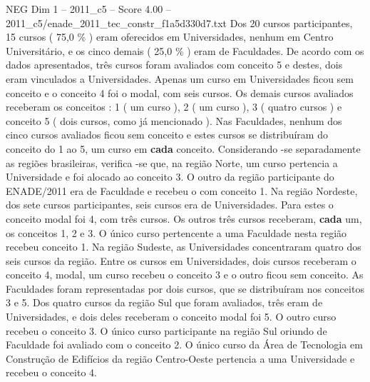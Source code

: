 \begin{textsample}{NEG Dim 1 – 2011\_c5 – Score 4.00 – 2011\_c5/enade\_2011\_tec\_constr\_f1a5d330d7.txt}
Dos 20 cursos participantes, 15 cursos ( 75,0 \% ) eram oferecidos em Universidades, nenhum em Centro Universitário, e os cinco demais ( 25,0 \% ) eram de Faculdades.
De acordo com os dados apresentados, três cursos foram avaliados com conceito 5 e destes, dois eram vinculados a Universidades.
Apenas um curso em Universidades ficou sem conceito e o conceito 4 foi o modal, com seis cursos.
Os demais cursos avaliados receberam os conceitos : 1 ( um curso ), 2 ( um curso ), 3 ( quatro cursos ) e conceito 5 ( dois cursos, como já mencionado ).
Nas Faculdades, nenhum dos cinco cursos avaliados ficou sem conceito e estes cursos se distribuíram do conceito do 1 ao 5, um curso em \textbf{cada} conceito.
Considerando -se separadamente as regiões brasileiras, verifica -se que, na região Norte, um curso pertencia a Universidade e foi alocado ao conceito 3.
O outro da região participante do ENADE/2011 era de Faculdade e recebeu o com conceito 1.
Na região Nordeste, dos sete cursos participantes, seis cursos era de Universidades.
Para estes o conceito modal foi 4, com três cursos.
Os outros três cursos receberam, \textbf{cada} um, os conceitos 1, 2 e 3.
O único curso pertencente a uma Faculdade nesta região recebeu conceito 1.
Na região Sudeste, as Universidades concentraram quatro dos seis cursos da região.
Entre os cursos em Universidades, dois cursos receberam o conceito 4, modal, um curso recebeu o conceito 3 e o outro ficou sem conceito.
As Faculdades foram representadas por dois cursos, que se distribuíram nos conceitos 3 e 5.
Dos quatro cursos da região Sul que foram avaliados, três eram de Universidades, e dois deles receberam o conceito modal foi 5.
O outro curso recebeu o conceito 3.
O único curso participante na região Sul oriundo de Faculdade foi avaliado com o conceito 2.
O único curso da Área de Tecnologia em Construção de Edifícios da região Centro-Oeste pertencia a uma Universidade e recebeu o conceito 4.

\end{textsample}

